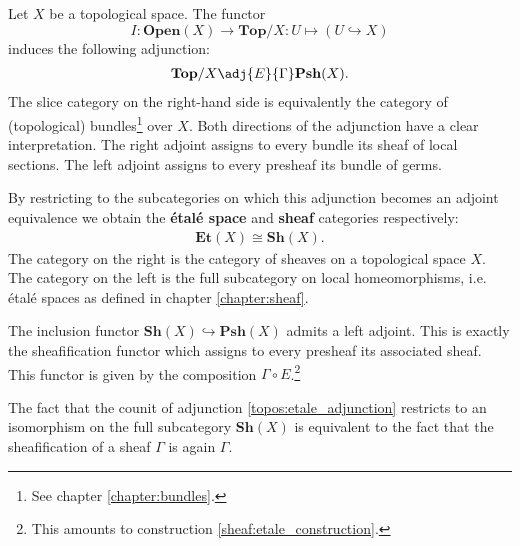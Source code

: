     \begin{construct}\label{topos:etale_adjunction}
        Let $X$ be a topological space. The functor \[I:\mathbf{Open}(X)\rightarrow\mathbf{Top}/X:U\mapsto(U\hookrightarrow X)\] induces the following adjunction:
        \begin{gather}
            \mathbf{Top}/X\adj{E}{\Gamma}\mathbf{Psh}(X).
        \end{gather}
        The slice category on the right-hand side is equivalently the category of (topological) bundles\footnote{See chapter \ref{chapter:bundles}.} over $X$. Both directions of the adjunction have a clear interpretation. The right adjoint assigns to every bundle its sheaf of local sections. The left adjoint assigns to every presheaf its bundle of germs.

        By restricting to the subcategories on which this adjunction becomes an adjoint equivalence we obtain the \textbf{\'etal\'e space} and \textbf{sheaf} categories respectively:
        \begin{gather}
            \mathbf{Et}(X)\cong\mathbf{Sh}(X).
        \end{gather}
        The category on the right is the category of sheaves on a topological space $X$. The category on the left is the full subcategory on local homeomorphisms, i.e. \'etal\'e spaces as defined in chapter \ref{chapter:sheaf}.
    \end{construct}

    \begin{property}
        The inclusion functor $\mathbf{Sh}(X)\hookrightarrow\mathbf{Psh}(X)$ admits a left adjoint. This is exactly the sheafification functor which assigns to every presheaf its associated sheaf. This functor is given by the composition $\Gamma\circ E$.\footnote{This amounts to construction \ref{sheaf:etale_construction}.}

        The fact that the counit of adjunction \ref{topos:etale_adjunction} restricts to an isomorphism on the full subcategory $\mathbf{Sh}(X)$ is equivalent to the fact that the sheafification of a sheaf $\Gamma$ is again $\Gamma$.
    \end{property}



